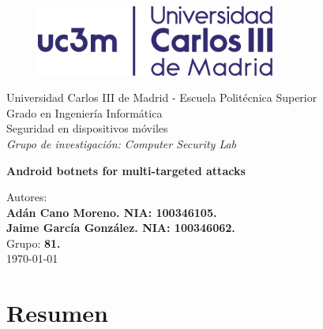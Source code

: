 \documentclass[a4paper,11pt]{report}
\begin{document}
\begin{titlepage}

\begin{center}
\vspace*{0.5in}
\begin{figure}[htb]
\begin{center}
\includegraphics[width=0.7\textwidth]{uc3m}
\end{center}
\end{figure}
\vspace*{1in}
Universidad Carlos III de Madrid - Escuela Politécnica Superior \\
Grado en Ingeniería Informática \\
Seguridad en dispositivos móviles \\

\vspace*{0.1in}
\emph{Grupo de investigación: Computer Security Lab}  \\

\vspace*{1.2in}
\begin{huge}
\textbf{Android botnets for multi-targeted attacks} \\
\end{huge}


\end{center}

\vfill
\begin{center}
Autores:\\
\textbf{Adán Cano Moreno. NIA: 100346105.}\\
\textbf{Jaime García González. NIA: 100346062.}\\
\vspace*{0.2in}
Grupo: \textbf{81.}\\
\vspace*{1in}
\today
\end{center}


\end{titlepage}


\tableofcontents

\chapter{Resumen}
\end{document}
